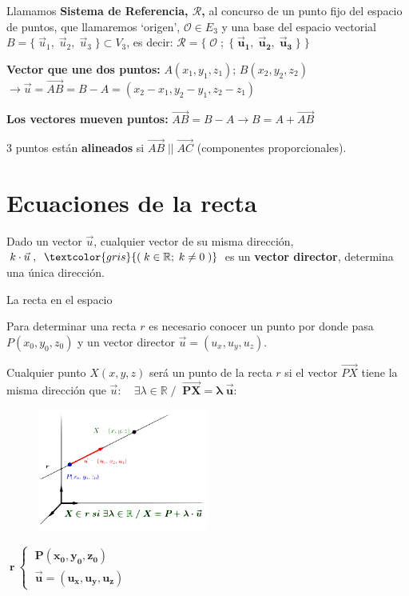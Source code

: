 \begin{defi} Llamamos \textbf{Sistema de Referencia, $\boldsymbol{\mathcal R}$,} al concurso de un punto fijo del espacio de puntos, que llamaremos `origen', $\mathcal O \in E_3$ y una base del espacio vectorial $B=\{ \; \vec u_1,\; \vec u_2, \; \vec u_3 \; \}\subset V_3$, es decir: $\boldsymbol{\mathcal R = \{\; \mathcal O\; ; \;  \{ \; \vec u_1,\; \vec u_2, \; \vec u_3 \; \} \; \}}$
\end{defi}

\textbf{Vector que une dos puntos:} $A(x_1,y_1,z_1)$; $B(x_2,y_2,z_2)$ $\to \vec u = \overrightarrow{AB}=B-A=(x_2-x_1,y_2-y_1,z_2-z_1)$

\textbf{Los vectores mueven puntos:} $\overrightarrow{AB}=B-A \to B=A+\overrightarrow{AB}$

3 puntos están \textbf{alineados} si $\overrightarrow{AB}\;||\;\overrightarrow{AC}$ (componentes proporcionales).


 \section{Ecuaciones de la recta}
	
	\begin{defi}
	Dado un vector $\vec u$, cualquier vector de su misma dirección, $k\cdot \vec u\;,\;\; \textcolor{gris}{(\;k\in \mathbb R; \; k \neq 0	\;)}$ es un \textbf{vector director}, determina una única dirección.
	\end{defi}

\begin{myblock}{La recta en el espacio}
\begin{multicols}{2}
Para determinar una recta $r$ es necesario conocer un punto por donde pasa $P(x_0,y_0,z_0)$ y un vector director $\vec u=(u_x,u_y,u_z)$.

Cualquier punto $X(x,y,z)$ será un punto de la recta $r$ si el vector $\overrightarrow {PX}$ tiene la misma dirección que $\vec u: \quad \exists \lambda \in \mathbb R\;/ \;\; \boldsymbol{\overrightarrow {PX}=\lambda \; \vec u}$:

	\begin{figure}[H]
		\centering
		\includegraphics[width=0.5\textwidth]{imagenes/imagenes10/T10IM01.png}
	\end{figure}
\end{multicols}	


\centerline{$\;\boldsymbol{ r\: \begin{cases} \; P(x_0,y_0,z_0) \\\; \vec u=(u_x,u_y,u_z) \end{cases}\; }$}

\end{myblock}

